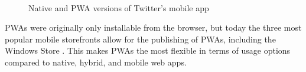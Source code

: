 \documentclass[a4paper,12pt]{article}
\begin{document}
\begin{figure}[h]%
	\centering
	$\,$
	$\,$
	\caption{Native and PWA versions of Twitter's mobile app}%
	\label{fig:twitter_pwa}%
\end{figure}

PWAs were originally only installable from the browser, but today the three most popular mobile storefronts allow for the publishing of PWAs, including the Windows Store \cite{how_to_publish_pwa_in_stores} . This makes PWAs the most flexible in terms of usage options compared to native, hybrid, and mobile web apps.
\end{document}
